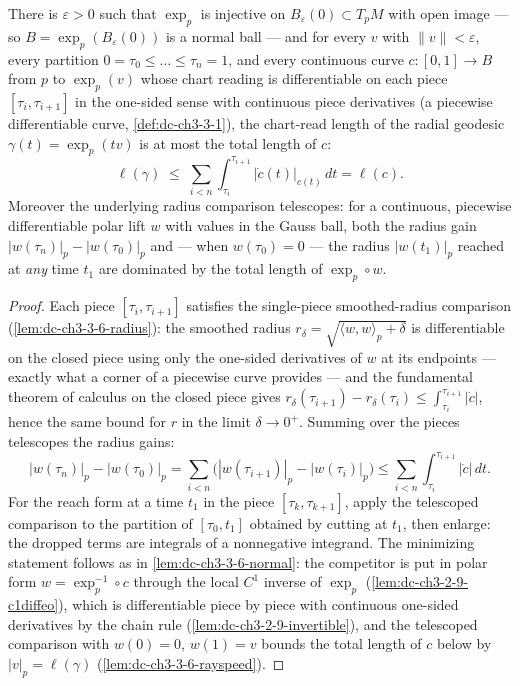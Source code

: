 \begin{lemma}
  \label{lem:dc-ch3-3-6-piecewise}


  There is $\varepsilon>0$ such that $\exp_p$ is injective on
  $B_\varepsilon(0)\subset T_pM$ with open image — so
  $B=\exp_p(B_\varepsilon(0))$ is a normal ball — and for every $v$ with
  $\|v\|<\varepsilon$, every partition $0=\tau_0\le\dots\le\tau_n=1$, and
  every continuous curve $c:[0,1]\to B$ from $p$ to $\exp_p(v)$ whose chart
  reading is differentiable on each piece $[\tau_i,\tau_{i+1}]$ in the
  one-sided sense with continuous piece derivatives (a piecewise
  differentiable curve, \cref{def:dc-ch3-3-1}), the chart-read length of the
  radial geodesic $\gamma(t)=\exp_p(tv)$ is at most the total length of $c$:
  $$\ell(\gamma)\;\le\;\sum_{i<n}\int_{\tau_i}^{\tau_{i+1}}
    \big|\dot c(t)\big|_{c(t)}\,dt=\ell(c).$$
  Moreover the underlying radius comparison telescopes: for a continuous,
  piecewise differentiable polar lift $w$ with values in the Gauss ball, both
  the radius gain $|w(\tau_n)|_p-|w(\tau_0)|_p$ and — when $w(\tau_0)=0$ —
  the radius $|w(t_1)|_p$ reached at \emph{any} time $t_1$ are dominated by
  the total length of $\exp_p\circ w$.
\end{lemma}
\begin{proof}
  \sketch

  Each piece $[\tau_i,\tau_{i+1}]$ satisfies the single-piece smoothed-radius
  comparison (\cref{lem:dc-ch3-3-6-radius}): the smoothed radius
  $r_\delta=\sqrt{\langle w,w\rangle_p+\delta}$ is differentiable on the
  closed piece using only the one-sided derivatives of $w$ at its endpoints —
  exactly what a corner of a piecewise curve provides — and the fundamental
  theorem of calculus on the closed piece gives
  $r_\delta(\tau_{i+1})-r_\delta(\tau_i)\le\int_{\tau_i}^{\tau_{i+1}}|\dot c|$,
  hence the same bound for $r$ in the limit $\delta\to0^+$. Summing over the
  pieces telescopes the radius gains:
  $$|w(\tau_n)|_p-|w(\tau_0)|_p
    =\sum_{i<n}\big(|w(\tau_{i+1})|_p-|w(\tau_i)|_p\big)
    \le\sum_{i<n}\int_{\tau_i}^{\tau_{i+1}}|\dot c|\,dt.$$
  For the reach form at a time $t_1$ in the piece $[\tau_k,\tau_{k+1}]$, apply
  the telescoped comparison to the partition of $[\tau_0,t_1]$ obtained by
  cutting at $t_1$, then enlarge: the dropped terms are integrals of a
  nonnegative integrand. The minimizing statement follows as in
  \cref{lem:dc-ch3-3-6-normal}: the competitor is put in polar form
  $w=\exp_p^{-1}\circ c$ through the local $C^1$ inverse of $\exp_p$
  (\cref{lem:dc-ch3-2-9-c1diffeo}), which is differentiable piece by piece
  with continuous one-sided derivatives by the chain rule
  (\cref{lem:dc-ch3-2-9-invertible}), and the telescoped comparison with
  $w(0)=0$, $w(1)=v$ bounds the total length of $c$ below by
  $|v|_p=\ell(\gamma)$ (\cref{lem:dc-ch3-3-6-rayspeed}).
\end{proof}

